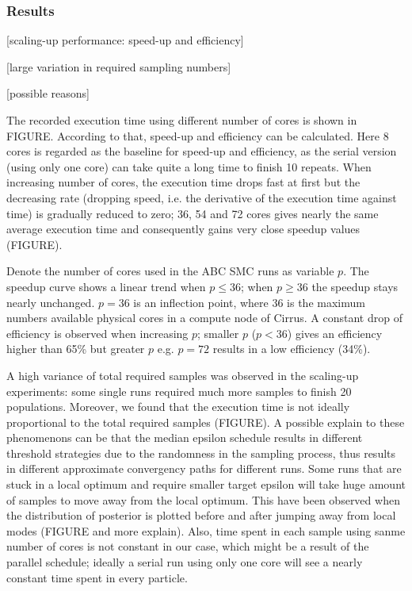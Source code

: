 \documentclass[12pt,a4paper]{report}
\begin{document}
\subsubsection{Results}

[scaling-up performance: speed-up and efficiency]

[large variation in required sampling numbers]

[possible reasons]

The recorded execution time using different number of cores is shown in FIGURE. According to that, speed-up and efficiency can be calculated. Here 8 cores is regarded as the baseline for speed-up and efficiency, as the serial version (using only one core) can take quite a long time to finish 10 repeats. When increasing number of cores, the execution time drops fast at first but the decreasing rate (dropping speed, i.e. the derivative of the execution time against time) is gradually reduced to zero; 36, 54 and 72 cores gives nearly the same average execution time and consequently gains very close speedup values (FIGURE). 

Denote the number of cores used in the ABC SMC runs as variable $p$. The speedup curve shows a linear trend when $p\leq 36$; when $p\geq 36$ the speedup stays nearly unchanged. $p=36$ is an inflection point, where 36 is the maximum numbers available physical cores in a compute node of Cirrus. A constant drop of efficiency is observed when increasing $p$; smaller $p$ ($p<36$) gives an efficiency higher than 65\% but greater $p$ e.g. $p=72$ results in a low efficiency (34\%).

A high variance of total required samples was observed in the scaling-up experiments: some single runs required much more samples to finish 20 populations. Moreover, we found that the execution time is not ideally proportional to the total required samples (FIGURE). A possible explain to these phenomenons can be that the median epsilon schedule results in different threshold strategies due to the randomness in the sampling process, thus results in different approximate convergency paths for different runs. Some runs that are stuck in a local optimum and require smaller target epsilon will take huge amount of samples to move away from the local optimum. This have been observed when the distribution of posterior is plotted before and after jumping away from local modes (FIGURE and more explain). Also, time spent in each sample using sanme number of cores is not constant in our case, which might be a result of the parallel schedule; ideally a serial run using only one core will see a nearly constant time spent in every particle.
\end{document}
